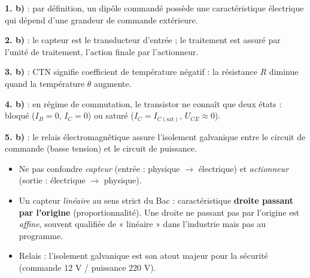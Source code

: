 \documentclass[11pt]{article}
\newcommand{\cle}[1]{{\popxbold\color{popdark}#1}}
\begin{document}
\begin{corrige}
\textbf{1. b)} : par définition, un \cle{dipôle commandé} possède une caractéristique électrique qui dépend d'une grandeur de commande extérieure.

\textbf{2. b)} : le \cle{capteur} est le transducteur d'entrée ; le traitement est assuré par l'unité de traitement, l'action finale par l'\cle{actionneur}.

\textbf{3. b)} : CTN signifie \og coefficient de température négatif \fg{} : la résistance $R$ diminue quand la température $\theta$ augmente.

\textbf{4. b)} : en régime de \cle{commutation}, le transistor ne connaît que deux états : bloqué ($I_B = 0$, $I_C = 0$) ou saturé ($I_C = I_{C(\text{sat})}$, $U_{CE} \approx 0$).

\textbf{5. b)} : le \cle{relais électromagnétique} assure l'isolement galvanique entre le circuit de commande (basse tension) et le circuit de puissance.
\end{corrige}

\begin{attention}
\begin{itemize}
\item Ne pas confondre \emph{capteur} (entrée : physique $\rightarrow$ électrique) et \emph{actionneur} (sortie : électrique $\rightarrow$ physique).
\item Un capteur \emph{linéaire} au sens strict du Bac : caractéristique \textbf{droite passant par l'origine} (proportionnalité). Une droite ne passant pas par l'origine est \emph{affine}, souvent qualifiée de « linéaire » dans l'industrie mais pas au programme.
\item Relais : l'isolement galvanique est son atout majeur pour la sécurité (commande 12 V / puissance 220 V).
\end{itemize}
\end{attention}
\end{document}
